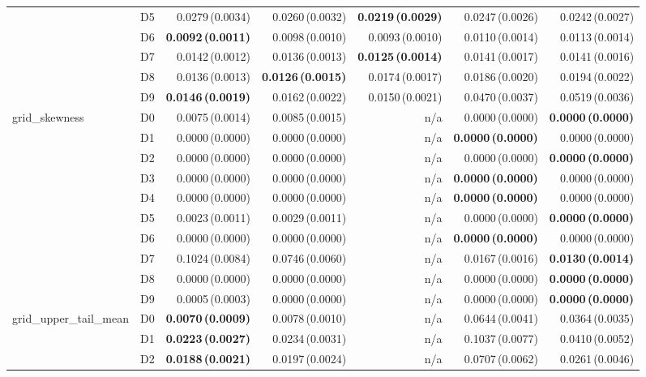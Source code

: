 \begin{table}[htbp]
\begin{tabular}{@{}llrrrrr@{}}
 & D5 & 0.0279\,(0.0034) & 0.0260\,(0.0032) & \textbf{0.0219\,(0.0029)} & 0.0247\,(0.0026) & 0.0242\,(0.0027) \\
 & D6 & \textbf{0.0092\,(0.0011)} & 0.0098\,(0.0010) & 0.0093\,(0.0010) & 0.0110\,(0.0014) & 0.0113\,(0.0014) \\
 & D7 & 0.0142\,(0.0012) & 0.0136\,(0.0013) & \textbf{0.0125\,(0.0014)} & 0.0141\,(0.0017) & 0.0141\,(0.0016) \\
 & D8 & 0.0136\,(0.0013) & \textbf{0.0126\,(0.0015)} & 0.0174\,(0.0017) & 0.0186\,(0.0020) & 0.0194\,(0.0022) \\
 & D9 & \textbf{0.0146\,(0.0019)} & 0.0162\,(0.0022) & 0.0150\,(0.0021) & 0.0470\,(0.0037) & 0.0519\,(0.0036) \\
\midrule
grid\_skewness & D0 & 0.0075\,(0.0014) & 0.0085\,(0.0015) & n/a & 0.0000\,(0.0000) & \textbf{0.0000\,(0.0000)} \\
 & D1 & 0.0000\,(0.0000) & 0.0000\,(0.0000) & n/a & \textbf{0.0000\,(0.0000)} & 0.0000\,(0.0000) \\
 & D2 & 0.0000\,(0.0000) & 0.0000\,(0.0000) & n/a & 0.0000\,(0.0000) & \textbf{0.0000\,(0.0000)} \\
 & D3 & 0.0000\,(0.0000) & 0.0000\,(0.0000) & n/a & \textbf{0.0000\,(0.0000)} & 0.0000\,(0.0000) \\
 & D4 & 0.0000\,(0.0000) & 0.0000\,(0.0000) & n/a & \textbf{0.0000\,(0.0000)} & 0.0000\,(0.0000) \\
 & D5 & 0.0023\,(0.0011) & 0.0029\,(0.0011) & n/a & 0.0000\,(0.0000) & \textbf{0.0000\,(0.0000)} \\
 & D6 & 0.0000\,(0.0000) & 0.0000\,(0.0000) & n/a & \textbf{0.0000\,(0.0000)} & 0.0000\,(0.0000) \\
 & D7 & 0.1024\,(0.0084) & 0.0746\,(0.0060) & n/a & 0.0167\,(0.0016) & \textbf{0.0130\,(0.0014)} \\
 & D8 & 0.0000\,(0.0000) & 0.0000\,(0.0000) & n/a & 0.0000\,(0.0000) & \textbf{0.0000\,(0.0000)} \\
 & D9 & 0.0005\,(0.0003) & 0.0000\,(0.0000) & n/a & 0.0000\,(0.0000) & \textbf{0.0000\,(0.0000)} \\
\midrule
grid\_upper\_tail\_mean & D0 & \textbf{0.0070\,(0.0009)} & 0.0078\,(0.0010) & n/a & 0.0644\,(0.0041) & 0.0364\,(0.0035) \\
 & D1 & \textbf{0.0223\,(0.0027)} & 0.0234\,(0.0031) & n/a & 0.1037\,(0.0077) & 0.0410\,(0.0052) \\
 & D2 & \textbf{0.0188\,(0.0021)} & 0.0197\,(0.0024) & n/a & 0.0707\,(0.0062) & 0.0261\,(0.0046) \\

\end{tabular}
\end{table}

